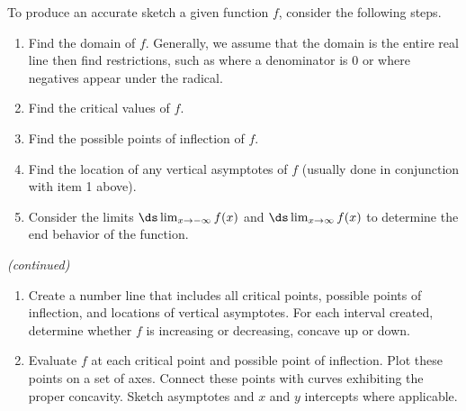 \enlargethispage{2\baselineskip}
{}
{To produce an accurate sketch a given function $f$, consider the following steps.
\begin{enumerate}
\item		Find the domain of $f$. Generally, we assume that the domain is the entire real line then find restrictions, such as where a denominator is 0 or where negatives appear under the radical.
\item		Find the critical values of $f$.
\item		Find the possible points of inflection of $f$.
\item		Find the location of any vertical asymptotes of $f$ (usually done in conjunction with item 1 above).
\item		Consider the limits $\ds\lim_{x\to-\infty}f(x)$ and $\ds\lim_{x\to\infty}f(x)$ to determine the end behavior of the function.
\end{enumerate}
\small\textit{(continued)}\normalsize
}
\addtocounter{keyideacounter}{-1}
{%
\begin{enumerate}\addtocounter{enumi}{5}
\item		Create a number line that includes all critical points, possible points of inflection, and locations of vertical asymptotes. For each interval created, determine whether $f$ is increasing or decreasing, concave up or down.
\item		Evaluate $f$ at each critical point and possible point of inflection. Plot these points on a set of axes. Connect these points with curves exhibiting the proper concavity. Sketch asymptotes and $x$ and $y$ intercepts where applicable.
\end{enumerate}
}
